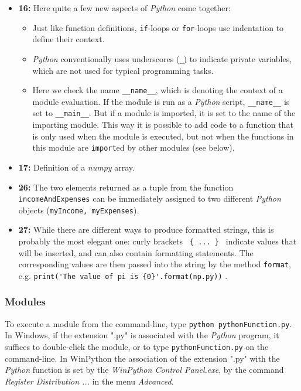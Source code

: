 \begin{itemize}
  \item \textbf{16:} Here quite a few new aspects of \emph{Python} come together:
      \begin{itemize}
        \item Just like function definitions, \lstinline{if}-loops or \lstinline{for}-loops use indentation to define their context.
        \item \emph{Python} conventionally uses underscores (\lstinline{_}) to indicate private variables, which are not used for typical programming tasks.
        \item Here we check the name \lstinline{__name__}, which is denoting the context of a module evaluation. If the module is run as a \emph{Python} script, \lstinline{__name__} is set to \lstinline{__main__}. But if a module is imported, it is set to the name of the importing module. This way it is possible to add code to a function that is only used when the module is executed, but not when the functions in this module are \lstinline{import}ed by other modules (see below).
      \end{itemize}

  \item \textbf{17:} Definition of a \emph{numpy} array.

  \item \textbf{26:} The two elements returned as a tuple from the function \lstinline{incomeAndExpenses} can be immediately assigned to two different \emph{Python} objects (\lstinline{myIncome, myExpenses}).

  \item \textbf{27:} While there are different ways to produce formatted strings, this is probably the most elegant one: curly brackets \lstinline| { ... } | indicate values that will be inserted, and can also contain formatting statements. The corresponding values are then passed into the string by the method \lstinline{format}, e.g. \lstinline|print('The value of pi is {0}'.format(np.py))| .
\end{itemize}

\subsubsection{Modules}

To execute a module from the command-line, type \lstinline{python pythonFunction.py}. In Windows, if the extension ".py" is associated with the \emph{Python} program, it suffices to double-click the module, or to type \lstinline{pythonFunction.py} on the command-line. In WinPython the association of the extension ".py" with the \emph{Python} function is set by the \emph{WinPython Control Panel.exe}, by the command \emph{Register Distribution ...} in the menu \emph{Advanced}.

